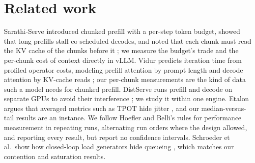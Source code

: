 \section{Related work}
\label{sec:related}

Sarathi-Serve introduced chunked prefill with a per-step token budget, showed that
long prefills stall co-scheduled decodes, and noted that each chunk must read the KV
cache of the chunks before it \citep{agrawal2024sarathiserve}; we measure the budget's
trade and the per-chunk cost of context directly in vLLM. Vidur predicts iteration time
from profiled operator costs, modeling prefill attention by prompt length and decode
attention by KV-cache reads \citep{agrawal2024vidur}; our per-chunk measurements are
the kind of data such a model needs for chunked prefill. DistServe runs prefill and
decode on separate GPUs to avoid their interference \citep{zhong2024distserve}; we
study it within one engine. Etalon argues that averaged metrics such as TPOT hide
jitter \citep{agrawal2024etalon}, and our median-versus-tail results are an instance.
We follow Hoefler and Belli's rules for performance measurement
\citep{hoefler2015scientific} in repeating runs, alternating run orders where the
design allowed, and reporting every result, but report no confidence intervals.
Schroeder et al.\ show how closed-loop load generators hide queueing
\citep{schroeder2006open}, which matches our contention and saturation results.
